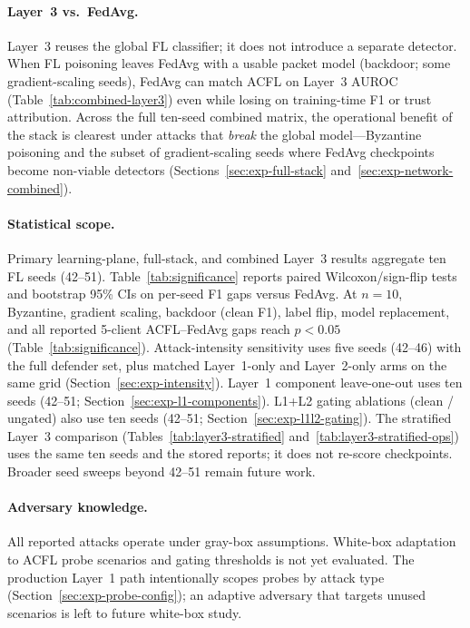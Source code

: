 \paragraph{Layer~3 vs.\ FedAvg.}
Layer~3 reuses the global FL classifier; it does not introduce a separate detector.
When FL poisoning leaves FedAvg with a usable packet model (backdoor; some gradient-scaling seeds), FedAvg can match ACFL on Layer~3 AUROC (Table~\ref{tab:combined-layer3}) even while losing on training-time F1 or trust attribution.
Across the full ten-seed combined matrix, the operational benefit of the stack is clearest under attacks that \emph{break} the global model---Byzantine poisoning and the subset of gradient-scaling seeds where FedAvg checkpoints become non-viable detectors (Sections~\ref{sec:exp-full-stack} and~\ref{sec:exp-network-combined}).

\paragraph{Statistical scope.}
Primary learning-plane, full-stack, and combined Layer~3 results aggregate ten FL seeds (42--51).
Table~\ref{tab:significance} reports paired Wilcoxon/sign-flip tests and bootstrap 95\% CIs on per-seed F1 gaps versus FedAvg.
At $n{=}10$, Byzantine, gradient scaling, backdoor (clean F1), label flip, model replacement, and all reported 5-client ACFL--FedAvg gaps reach $p{<}0.05$ (Table~\ref{tab:significance}).
Attack-intensity sensitivity uses five seeds (42--46) with the full defender set, plus matched Layer~1-only and Layer~2-only arms on the same grid (Section~\ref{sec:exp-intensity}).
Layer~1 component leave-one-out uses ten seeds (42--51; Section~\ref{sec:exp-l1-components}).
L1+L2 gating ablations (clean / ungated) also use ten seeds (42--51; Section~\ref{sec:exp-l1l2-gating}).
The stratified Layer~3 comparison (Tables~\ref{tab:layer3-stratified} and~\ref{tab:layer3-stratified-ops}) uses the same ten seeds and the stored reports; it does not re-score checkpoints.
Broader seed sweeps beyond 42--51 remain future work.

\paragraph{Adversary knowledge.}
All reported attacks operate under gray-box assumptions.
White-box adaptation to ACFL probe scenarios and gating thresholds is not yet evaluated.
The production Layer~1 path intentionally scopes probes by attack type (Section~\ref{sec:exp-probe-config}); an adaptive adversary that targets unused scenarios is left to future white-box study.

